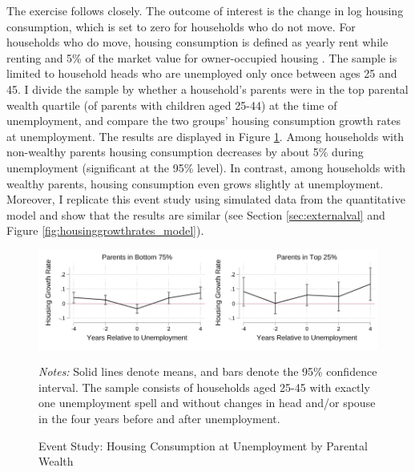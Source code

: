 \documentclass[12pt]{article}
\begin{document}
The exercise follows \cite{Chetty2007} closely. The outcome of interest is the change in log housing consumption, which is set to zero for households who do not move. For households who do move, housing consumption is defined as yearly rent while renting and 5\% of the market value for owner-occupied housing \citep{Davis2008}. The sample is limited to household heads who are unemployed only once between ages 25 and 45.  I divide the sample by whether a household's parents were in the top parental wealth quartile (of parents with children aged 25-44) at the time of unemployment, and compare the two groups' housing consumption growth rates at unemployment. The results are displayed in Figure \ref{fig:housinggrowthrates}. Among households with non-wealthy parents housing consumption decreases by about 5\% during unemployment (significant at the 95\% level). In contrast, among households with wealthy parents, housing consumption even grows slightly at unemployment. Moreover, I replicate this event study using simulated data from the quantitative model and show that the results are similar (see Section \ref{sec:externalval} and Figure \ref{fig:housinggrowthrates_model}).
\begin{figure}
	\caption{Event Study: Housing Consumption at Unemployment by Parental Wealth}\label{fig:housinggrowthrates}
	\noindent\includegraphics[width=0.5\textwidth]{../tabfig/descr/PSID_housinggrowthpoor_both}\includegraphics[width=0.5\textwidth]{../tabfig/descr/PSID_housinggrowthrich_both}

	{\begin{footnotesize} \textit{Notes:} Solid lines denote means, and bars denote the 95\% confidence interval. The sample consists of households aged 25-45 with exactly one unemployment spell and without changes in head and/or spouse in the four years before and after unemployment. \end{footnotesize}}
\end{figure}
\end{document}
